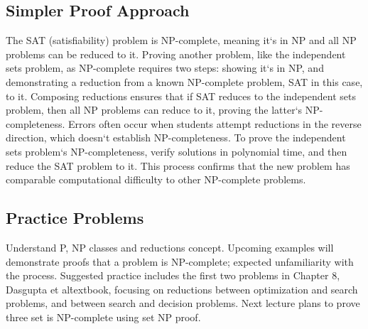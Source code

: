 \subsection*{Simpler Proof Approach}
The SAT (satisfiability) problem is NP-complete, meaning it`s in NP and all NP problems can be reduced to it.
Proving another problem, like the independent sets problem, as NP-complete requires two steps: showing it`s in NP, and demonstrating a reduction from a known NP-complete problem, SAT in this case, to it.
Composing reductions ensures that if SAT reduces to the independent sets problem, then all NP problems can reduce to it, proving the latter`s NP-completeness.
Errors often occur when students attempt reductions in the reverse direction, which doesn`t establish NP-completeness.
To prove the independent sets problem`s NP-completeness, verify solutions in polynomial time, and then reduce the SAT problem to it.
This process confirms that the new problem has comparable computational difficulty to other NP-complete problems.

\subsection*{Practice Problems}
Understand P, NP classes and reductions concept.
Upcoming examples will demonstrate proofs that a problem is NP-complete; expected unfamiliarity with the process.
Suggested practice includes the first two problems in Chapter 8, Dasgupta et al\. textbook, focusing on reductions between optimization and search problems, and between search and decision problems.
Next lecture plans to prove three set is NP-complete using set NP proof.

